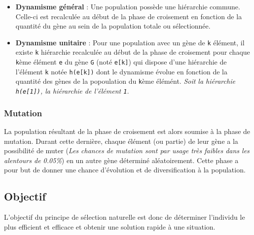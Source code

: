 \begin{enumerate}
\begin{itemize}
    \begin{itemize}
    \tightlist
    \item
      \textbf{Dynamisme général} : Une population possède une hiérarchie
      commune. Celle-ci est recalculée au début de la phase de
      croisement en fonction de la quantité du gène au sein de la
      population totale ou sélectionnée.
    \item
      \textbf{Dynamisme unitaire} : Pour une population avec un gène de
      \texttt{k} élément, il existe \texttt{k} hiérarchie recalculée au
      début de la phase de croisement pour chaque \texttt{k}ème élément
      \texttt{e} du gène \texttt{G} (noté \texttt{e{[}k{]}}) qui dispose
      d'une hiérarchie de l'élément \texttt{k} notée
      \texttt{h(e{[}k{]})} dont le dynamisme évolue en fonction de la
      quantité des gènes de la popoulation du \texttt{k}ème élémént.
      \emph{Soit la hiérarchie \texttt{h(e{[}1{]})}, la hiérarchie de
      l'élément \texttt{1}.}
    \end{itemize}
  \end{itemize}
\end{enumerate}

\hypertarget{mutation}{%
\subsubsection{Mutation}\label{mutation}}

La population résultant de la phase de croisement est alors soumise à la
phase de mutation. Durant cette dernière, chaque élément (ou partie) de
leur gène a la possibilité de muter (\emph{Les chances de mutation sont
par usage très faibles dans les alentours de 0.05\%}) en un autre gène
déterminé aléatoirement. Cette phase a pour but de donner une chance
d'évolution et de diversification à la population.

\hypertarget{objectif}{%
\subsection{Objectif}\label{objectif}}

L'objectif du principe de sélection naturelle est donc de déterminer
l'individu le plus efficient et efficace et obtenir une solution rapide
à une situation.

